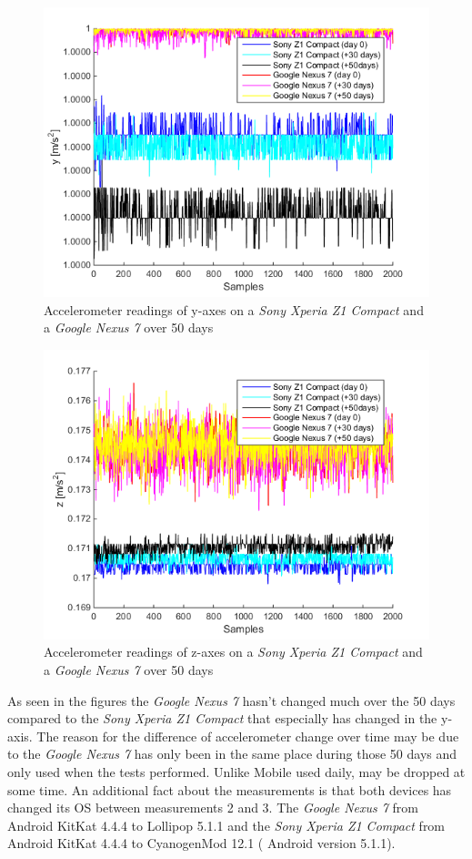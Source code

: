 \begin{figure}[H]
	\centering
	\includegraphics[scale=.7]{img/sensrec-nex-z1-acc-y}
	\caption{Accelerometer readings of y-axes on a  \textit{Sony Xperia Z1 Compact} and a \textit{Google Nexus 7} over 50 days}
	\label{fig:y50days}
\end{figure}
\begin{figure}[H]
	\centering
	\includegraphics[scale=.7]{img/sensrec-nex-z1-acc-z}
	\caption{Accelerometer readings of z-axes on a  \textit{Sony Xperia Z1 Compact} and a \textit{Google Nexus 7} over 50 days}
	\label{fig:z50days}
\end{figure}
As seen in the figures the \textit{Google Nexus 7} hasn't changed much over the 50 days compared to the \textit{Sony Xperia Z1 Compact} that especially has changed in the y-axis. The reason for the difference of accelerometer change over time may be due to the \textit{Google Nexus 7} has only been in the same place during those 50 days and only used when the tests performed. Unlike Mobile used daily, may be dropped at some time. An additional fact about the measurements is that both devices has changed its OS between measurements 2 and 3. The \textit{Google Nexus 7} from Android KitKat 4.4.4 to Lollipop 5.1.1 and the \textit{Sony Xperia Z1 Compact} from Android KitKat 4.4.4 to CyanogenMod 12.1 ( Android version 5.1.1). \\
